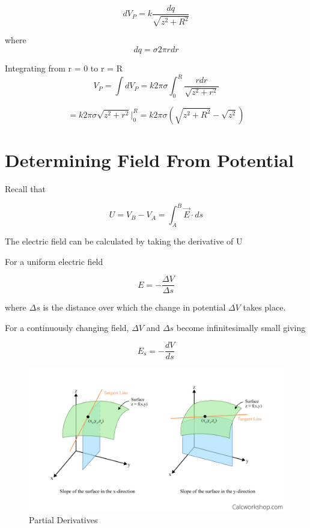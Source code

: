\documentclass[14pt]{memoir}
\begin{document}
\begin{equation}
dV_P = k \frac{dq}{\sqrt{z^2 + R^2}}
\end{equation}

where
\begin{equation}
dq = \sigma 2\pi r dr
\end{equation}

Integrating from r = 0 to r = R
\begin{equation}
V_P = \int dV_P = k2\pi\sigma \int_0^R \frac{rdr}{\sqrt{z^2 + r^2}} 
\end{equation}

\begin{equation}
= k2\pi\sigma {\sqrt{z^2 + r^2}} \bigg\rvert_{0}^{R} = k2\pi\sigma (\sqrt{z^2 + R^2}-\sqrt{z^2})
\end{equation}

\section{Determining Field From Potential}

Recall that

\begin{equation}
U = V_B - V_A = \int_A^B \vec{E} \cdot ds
\end{equation}

The electric field can be calculated by taking the derivative of U

For a uniform electric field

\begin{equation}
E = -\frac{\Delta V}{\Delta s}
\end{equation}

where $\Delta s$ is the distance over which the change in potential $\Delta V$ takes place.

For a continuously changing field, $\Delta V$ and $\Delta s$ become infinitesimally small giving 

\begin{equation}
E_s = -\frac{dV}{ds}
\end{equation}


\begin{figure}[H]
\begin{center}
\includegraphics[scale=0.30]{fig/partialderivative.png}
\caption{Partial Derivatives}
\label{fig:pder}
\end{center}
\end{figure}
\end{document}
